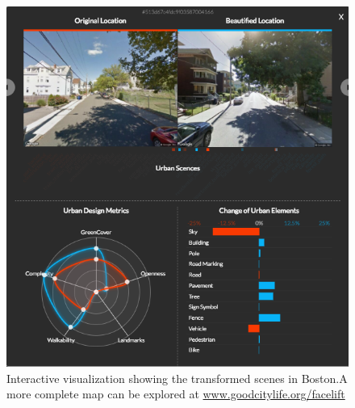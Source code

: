\begin{figure}[t!]
    \centering
    \includegraphics[width=\columnwidth]{UI.png}
    \caption{Interactive visualization showing the transformed scenes in Boston.A more complete map can be explored at \url{www.goodcitylife.org/facelift}}
    \label{facelift-UI}
\end{figure}


